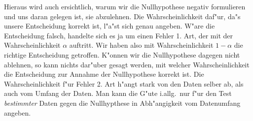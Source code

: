 



Hieraus wird auch ersichtlich, warum wir die Nullhypothese negativ formulieren und uns
daran gelegen ist, sie abzulehnen.  Die Wahrscheinlichkeit daf"ur, da"s unsere
Entscheidung korrekt ist, l"a"st sich genau angeben. W"are die Entscheidung falsch,
handelte sich es ja um einen Fehler 1. Art, der mit der Wahrscheinlichkeit $\alpha$
auftritt. Wir haben also mit Wahrscheinlichkeit $1-\alpha$ die richtige Entscheidung
getroffen.  K"onnen wir die Nullhypothese dagegen nicht ablehnen, so kann nichts dar"uber
gesagt werden, mit welcher Wahrscheinlichkeit die Entscheidung zur Annahme der
Nullhypothese korrekt ist. Die Wahrscheinlichkeit f"ur Fehler 2. Art h"angt stark von den
Daten selber ab, als auch vom Umfang der Daten. Man kann die G"ute i.allg.\ nur f"ur den
Test {\em bestimmter} Daten gegen die Nullhypthese in Abh"angigkeit vom Datenumfang
angeben.


